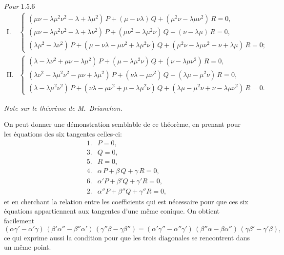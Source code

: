 \documentclass[11pt,a4paper]{book}
\begin{document}
\textit{Pour} $1.5.6$
\[
\begin{array}{ll}
\text{I.} & \begin{cases}
(\mu\nu - \lambda\mu^2\nu^2 - \lambda + \lambda\mu^2)\, P + (\mu - \nu\lambda)\, Q + (\mu^2\nu - \lambda\mu\nu^2)\, R = 0, \\[2pt]
(\mu\nu - \lambda\mu^2\nu^2 - \lambda + \lambda\nu^2)\, P + (\mu\nu^2 - \lambda\mu^2\nu)\, Q + (\nu - \lambda\mu)\, R = 0, \\[2pt]
(\lambda\mu^2 - \lambda\nu^2)\, P + (\mu - \nu\lambda - \mu\nu^2 + \lambda\mu^2\nu)\, Q + (\mu^2\nu - \lambda\mu\nu^2 - \nu + \lambda\mu)\, R = 0;
\end{cases} \\[24pt]
\text{II.} & \begin{cases}
(\lambda - \lambda\nu^2 + \mu\nu - \lambda\mu^2)\, P + (\mu - \lambda\mu^2\nu)\, Q + (\nu - \lambda\mu\nu^2)\, R = 0, \\[2pt]
(\lambda\nu^2 - \lambda\mu^2\nu^2 - \mu\nu + \lambda\mu^2)\, P + (\nu\lambda - \mu\nu^2)\, Q + (\lambda\mu - \mu^2\nu)\, R = 0, \\[2pt]
(\lambda - \lambda\mu^2\nu^2)\, P + (\nu\lambda - \mu\nu^2 + \mu - \lambda\mu^2\nu)\, Q + (\lambda\mu - \mu^2\nu + \nu - \lambda\mu\nu^2)\, R = 0.
\end{cases}
\end{array}
\]

\begin{center}\textit{Note sur le th\'eor\`eme de M.~Brianchon.}\end{center}

On peut donner une d\'emonstration semblable de ce th\'eor\`eme, en prenant pour les \'equations des six tangentes celles-ci:
\[
\begin{array}{rl}
1. & P = 0, \\
3. & Q = 0, \\
5. & R = 0, \\
4. & \alpha\, P + \beta\, Q + \gamma\, R = 0, \\
6. & \alpha' P + \beta' Q + \gamma' R = 0, \\
2. & \alpha'' P + \beta'' Q + \gamma'' R = 0,
\end{array}
\]
et en cherchant la relation entre les coefficients qui est n\'ecessaire pour que ces six \'equations appartiennent aux tangentes d'une m\^eme conique. On obtient facilement
\[
(\alpha\gamma' - \alpha'\gamma)\,(\beta'\alpha'' - \beta''\alpha')\,(\gamma''\beta - \gamma\beta'') = (\alpha'\gamma'' - \alpha''\gamma')\,(\beta''\alpha - \beta\alpha'')\,(\gamma\beta' - \gamma'\beta),
\]
ce qui exprime aussi la condition pour que les trois diagonales se rencontrent dans un m\^eme point.
\end{document}
